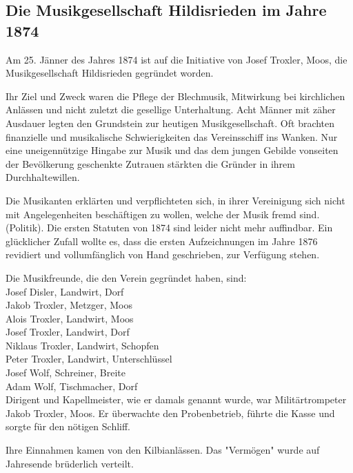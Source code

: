 \begin{multicols}{2}

    \section{Die Musikgesellschaft Hildisrieden im Jahre 1874}

    Am 25. Jänner des Jahres 1874 ist auf die Initiative
    von Josef Troxler, Moos, die Musikgesellschaft Hildisrieden
    gegründet worden.

    Ihr Ziel und Zweck waren
    die Pflege der Blechmusik, Mitwirkung bei kirchlichen
    Anlässen und nicht zuletzt die gesellige Unterhaltung.
    Acht Männer mit zäher Ausdauer legten den
    Grundstein zur heutigen Musikgesellschaft. Oft brachten finanzielle und musikalische
    Schwierigkeiten das Vereinsschiff ins Wanken.
    Nur eine uneigennützige Hingabe zur Musik und das
    dem jungen Gebilde vonseiten der Bevölkerung geschenkte
    Zutrauen stärkten die Gründer in ihrem
    Durchhaltewillen.

    Die Musikanten erklärten und verpflichteten sich,
    in ihrer Vereinigung sich nicht mit Angelegenheiten
    beschäftigen zu wollen, welche der Musik fremd sind.
    (Politik). Die ersten Statuten von 1874 sind leider
    nicht mehr auffindbar. Ein glücklicher Zufall wollte
    es, dass die ersten Aufzeichnungen im Jahre 1876 revidiert
    und vollumfänglich von Hand geschrieben, zur
    Verfügung stehen.

    Die Musikfreunde, die den Verein gegründet haben, sind:\\

    \noindent
    Josef Disler, Landwirt, Dorf\\
    Jakob Troxler, Metzger, Moos\\
    Alois Troxler, Landwirt, Moos\\
    Josef Troxler, Landwirt, Dorf\\
    Niklaus Troxler, Landwirt, Schopfen\\
    Peter Troxler, Landwirt, Unterschlüssel\\
    Josef Wolf, Schreiner, Breite\\
    Adam Wolf, Tischmacher, Dorf\\


    Dirigent und Kapellmeister, wie er damals genannt
    wurde, war Militärtrompeter Jakob Troxler, Moos.
    Er überwachte den Probenbetrieb, führte die Kasse
    und sorgte für den nötigen Schliff.

    Ihre Einnahmen kamen von den Kilbianlässen. Das
    "Vermögen" wurde auf Jahresende brüderlich verteilt.

\end{multicols}

